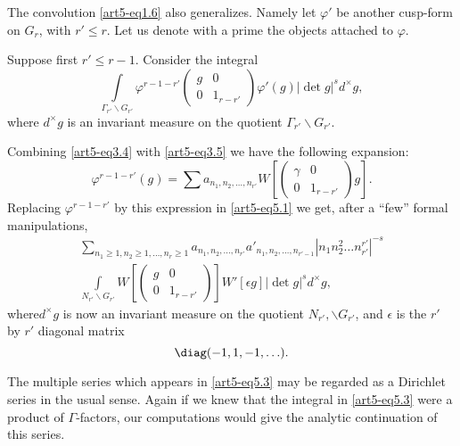 The convolution \eqref{art5-eq1.6} also generalizes. Namely let $\varphi'$ be another cusp-form on $G_{r}$, with $r'\leq r$. Let us denote with a prime the objects attached to $\varphi$.

Suppose first $r'\leq r-1$. Consider the integral
\begin{equation*}
\int\limits_{\Gamma_{r'}\backslash G_{r'}}\varphi^{r-1-r'}
\left(
\begin{matrix}
g & 0\\
0 & 1_{r-r'}
\end{matrix}
\right)
\varphi'(g)|\det g|^{s}d^{\times}g,\tag{5.1}\label{art5-eq5.1}
\end{equation*}
where $d^{\times}g$ is an invariant measure on the quotient $\Gamma_{r'}\backslash G_{r'}$.

Combining \eqref{art5-eq3.4} with \eqref{art5-eq3.5} we have the following expansion:
\begin{equation*}
\varphi^{r-1-r'}(g)=\sum a_{n_{1},n_{2},\ldots,n_{r'}}W
\left[
\left(
\begin{matrix}
\gamma & 0\\
0 & 1_{r-r'}
\end{matrix}
\right)
g
\right].\tag{5.2}\label{art5-eq5.2}
\end{equation*}
Replacing $\varphi^{r-1-r'}$ by this expression in \eqref{art5-eq5.1} we get, after a ``few'' formal manipulations,
\begin{gather*}
\sum\limits_{n_{1}\geq 1,n_{2}\geq 1,\ldots,n_{r}\geq 1}a_{n_{1},n_{2},\ldots,n_{r'}}a'_{n_{1},n_{2},\ldots,n_{r'-1}}|n_{1}n^{2}_{2}\ldots n^{r'}_{r'}|^{-s}\tag{5.3}\label{art5-eq5.3}\\[3pt]
\int\limits_{N_{r'}\backslash G_{r'}}W
\left[
\left(
\begin{matrix}
g & 0\\
0 & 1_{r-r'}
\end{matrix}
\right)
\right]
W'[\epsilon g]|\det g|^{s}d^{\times}g,
\end{gather*}
where\pageoriginale $d^{\times}g$ is now an invariant measure on the quotient $N_{r'},\backslash G_{r'}$, and $\epsilon$ is the $r'$ by $r'$ diagonal matrix
$$
\diag (-1,1,-1,\ldots).
$$

The multiple series which appears in \eqref{art5-eq5.3} may be regarded as a Dirichlet series in the usual sense. Again if we knew that the integral in \eqref{art5-eq5.3} were a product of $\Gamma$-factors, our computations would give the analytic continuation of this series.

